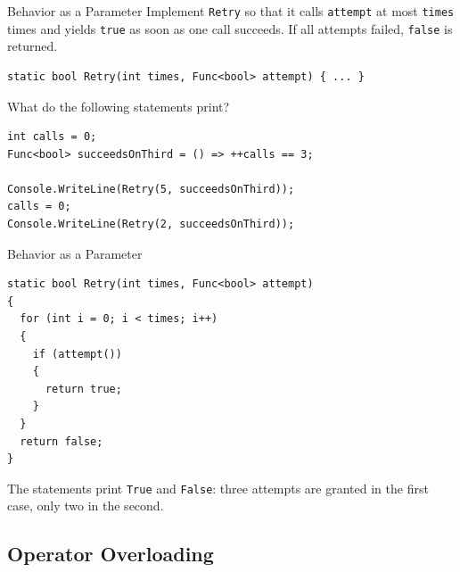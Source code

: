 \begin{exerciseframe}{Behavior as a Parameter}
  Implement \texttt{Retry} so that it calls \texttt{attempt} at most
  \texttt{times} times and yields \texttt{true} as soon as one call succeeds.
  If all attempts failed, \texttt{false} is returned.
  \vspace{1ex}

  \begin{lstlisting}[basicstyle=\scriptsize\ttfamily]
static bool Retry(int times, Func<bool> attempt) { ... }
  \end{lstlisting}

  What do the following statements print?
  \vspace{1ex}

\begin{lstlisting}[basicstyle=\scriptsize\ttfamily]
int calls = 0;
Func<bool> succeedsOnThird = () => ++calls == 3;

Console.WriteLine(Retry(5, succeedsOnThird));
calls = 0;
Console.WriteLine(Retry(2, succeedsOnThird));
  \end{lstlisting}
\end{exerciseframe}

\begin{solutionframe}{Behavior as a Parameter}
  \begin{lstlisting}[basicstyle=\scriptsize\ttfamily]
static bool Retry(int times, Func<bool> attempt)
{
  for (int i = 0; i < times; i++)
  {
    if (attempt())
    {
      return true;
    }
  }
  return false;
}
  \end{lstlisting}
  The statements print \texttt{True} and \texttt{False}: three attempts are
  granted in the first case, only two in the second.
  \vspace{3ex}

\end{solutionframe}

\subsection{Operator Overloading}

